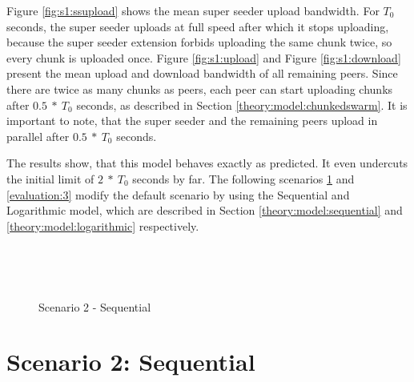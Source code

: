 Figure \ref{fig:s1:ssupload} shows the mean super seeder upload bandwidth. For $T_0$ seconds, the super seeder uploads at full speed after which it stops uploading, because the super seeder extension forbids uploading the same chunk twice, so every chunk is uploaded once. Figure \ref{fig:s1:upload} and Figure \ref{fig:s1:download} present the mean upload and download bandwidth of all remaining peers. Since there are twice as many chunks as peers, each peer can start uploading chunks after $0.5\:*\:T_0$ seconds, as described in Section \ref{theory:model:chunkedswarm}. It is important to note, that the super seeder and the remaining peers upload in parallel after $0.5\:*\:T_0$ seconds.

The results show, that this model behaves exactly as predicted. It even undercuts the initial limit of $2\:*\:T_0$ seconds by far. The following scenarios \ref{evaluation:2} and \ref{evaluation:3} modify the default scenario by using the Sequential and Logarithmic model, which are described in Section \ref{theory:model:sequential} and \ref{theory:model:logarithmic} respectively.


\vfill
\pagebreak

\begin{figure}[ht]
	\begin{center}
		~ %

		~ %

		\caption{Scenario 2 - Sequential}
		\label{fig:s2}
	\end{center}
\end{figure}

\pagebreak
\section{Scenario 2: Sequential}
\label{evaluation:2}

